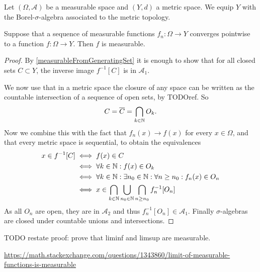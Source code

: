\begin{proposition} \label{pointWiseConvergenceMeasurable}
Let $(\Omega,\mathcal{A})$ be a measurable space and $(Y,d)$ a metric space. We equip $Y$ with the Borel-$\sigma$-algebra associated to the metric topology.

Suppose that a sequence of measurable functions $f_n : \Omega \to Y$ converges pointwise to a function $f:\Omega\to Y$. Then $f$ is measurable.
\end{proposition}
\begin{proof}
By \ref{measurableFromGeneratingSet} it is enough to show that for all closed sets $C\subset Y$, the inverse image $f^{-1}[C]$ is in $\mathcal{A}_1$.

We now use that in a metric space the closure of any space can be written as the countable intersection of a sequence of open sets, by TODOref. So
\[ C = \overline{C} = \bigcap_{k\in\mathbb{N}}O_k. \]
Now we combine this with the fact that $f_n(x)\to f(x)$ for every $x\in\Omega$, and that every metric space is sequential, to obtain the equivalences
\begin{align*}
x\in f^{-1}[C] &\iff f(x)\in C \\
&\iff \forall k\in\mathbb{N}: f(x)\in O_k\\
&\iff \forall k\in\mathbb{N}: \exists n_0\in\mathbb{N}: \forall n\geq n_0: f_n(x)\in O_n \\
&\iff x\in \bigcap_{k\in\mathbb{N}}\bigcup_{n_0\in\mathbb{N}}\bigcap_{n\geq n_0}f^{-1}_n[O_n]
\end{align*}
As all $O_n$ are open, they are in $\mathcal{A}_2$ and thus $f^{-1}_n[O_n]\in\mathcal{A}_1$. Finally $\sigma$-algebras are closed under countable unions and intersections.
\end{proof}
TODO restate proof: prove that liminf and limsup are measurable.

\url{https://math.stackexchange.com/questions/1343860/limit-of-measurable-functions-is-measurable}

\begin{proposition}

\end{proposition}

